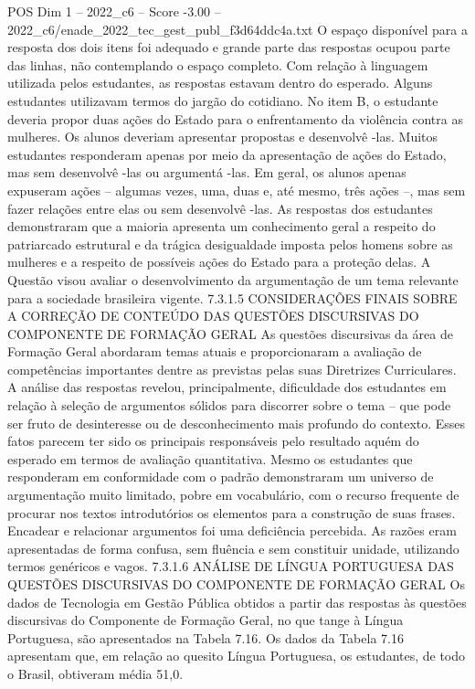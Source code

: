 \begin{textsample}{POS Dim 1 – 2022\_c6 – Score -3.00 – 2022\_c6/enade\_2022\_tec\_gest\_publ\_f3d64ddc4a.txt}
O espaço disponível para a resposta dos dois itens foi adequado e grande parte das respostas ocupou parte das linhas, não contemplando o espaço completo.
Com relação à linguagem utilizada pelos estudantes, as respostas estavam dentro do esperado.
Alguns estudantes utilizavam termos do jargão do cotidiano.
No item B, o estudante deveria propor duas ações do Estado para o enfrentamento da violência contra as mulheres.
Os alunos deveriam apresentar propostas e desenvolvê -las.
Muitos estudantes responderam apenas por meio da apresentação de ações do Estado, mas sem desenvolvê -las ou argumentá -las.
Em geral, os alunos apenas expuseram ações – algumas vezes, uma, duas e, até mesmo, três ações –, mas sem fazer relações entre elas ou sem desenvolvê -las.
As respostas dos estudantes demonstraram que a maioria apresenta um conhecimento geral a respeito do patriarcado estrutural e da trágica desigualdade imposta pelos homens sobre as mulheres e a respeito de possíveis ações do Estado para a proteção delas.
A Questão visou avaliar o desenvolvimento da argumentação de um tema relevante para a sociedade brasileira vigente. 7.3.1.5 CONSIDERAÇÕES FINAIS SOBRE A CORREÇÃO DE CONTEÚDO DAS QUESTÕES DISCURSIVAS DO COMPONENTE DE FORMAÇÃO GERAL As questões discursivas da área de Formação Geral abordaram temas atuais e proporcionaram a avaliação de competências importantes dentre as previstas pelas suas Diretrizes Curriculares.
A análise das respostas revelou, principalmente, dificuldade dos estudantes em relação à seleção de argumentos sólidos para discorrer sobre o tema – que pode ser fruto de desinteresse ou de desconhecimento mais profundo do contexto.
Esses fatos parecem ter sido os principais responsáveis pelo resultado aquém do esperado em termos de avaliação quantitativa.
Mesmo os estudantes que responderam em conformidade com o padrão demonstraram um universo de argumentação muito limitado, pobre em vocabulário, com o recurso frequente de procurar nos textos introdutórios os elementos para a construção de suas frases.
Encadear e relacionar argumentos foi uma deficiência percebida.
As razões eram apresentadas de forma confusa, sem fluência e sem constituir unidade, utilizando termos genéricos e vagos. 7.3.1.6 ANÁLISE DE LÍNGUA PORTUGUESA DAS QUESTÕES DISCURSIVAS DO COMPONENTE DE FORMAÇÃO GERAL Os dados de Tecnologia em Gestão Pública obtidos a partir das respostas às questões discursivas do Componente de Formação Geral, no que tange à Língua Portuguesa, são apresentados na Tabela 7.16.
Os dados da Tabela 7.16 apresentam que, em relação ao quesito Língua Portuguesa, os estudantes, de todo o Brasil, obtiveram média 51,0.

\end{textsample}
